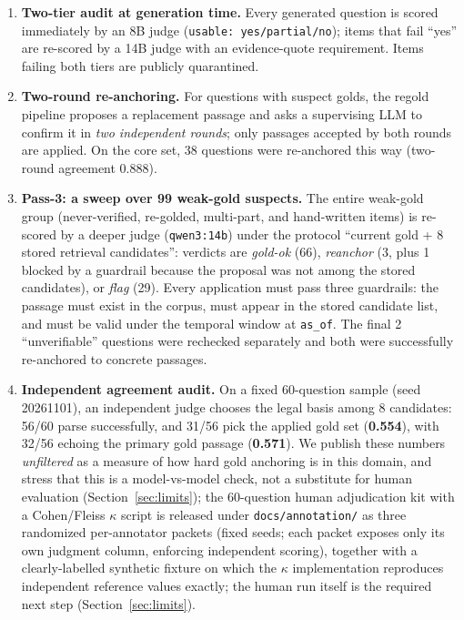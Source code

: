 \documentclass[10pt,a4paper,twocolumn]{article}
\newcommand{\code}[1]{\texttt{#1}}
\begin{document}
\begin{enumerate}
\item \textbf{Two-tier audit at generation time.} Every generated question is scored immediately by an 8B judge (\code{usable: yes/partial/no}); items that fail ``yes'' are re-scored by a 14B judge with an evidence-quote requirement. Items failing both tiers are publicly quarantined.
\item \textbf{Two-round re-anchoring.} For questions with suspect golds, the regold pipeline proposes a replacement passage and asks a supervising LLM to confirm it in \emph{two independent rounds}; only passages accepted by both rounds are applied. On the core set, 38 questions were re-anchored this way (two-round agreement 0.888).
\item \textbf{Pass-3: a sweep over 99 weak-gold suspects.} The entire weak-gold group (never-verified, re-golded, multi-part, and hand-written items) is re-scored by a deeper judge (\code{qwen3:14b}) under the protocol ``current gold + 8 stored retrieval candidates'': verdicts are \emph{gold-ok} (66), \emph{reanchor} (3, plus 1 blocked by a guardrail because the proposal was not among the stored candidates), or \emph{flag} (29). Every application must pass three guardrails: the passage must exist in the corpus, must appear in the stored candidate list, and must be valid under the temporal window at \code{as\_of}. The final 2 ``unverifiable'' questions were rechecked separately and both were successfully re-anchored to concrete passages.
\item \textbf{Independent agreement audit.} On a fixed 60-question sample (seed 20261101), an independent judge chooses the legal basis among 8 candidates: 56/60 parse successfully, and 31/56 pick the applied gold set (\textbf{0.554}), with 32/56 echoing the primary gold passage (\textbf{0.571}). We publish these numbers \emph{unfiltered} as a measure of how hard gold anchoring is in this domain, and stress that this is a model-vs-model check, not a substitute for human evaluation (Section~\ref{sec:limits}); the 60-question human adjudication kit with a Cohen/Fleiss $\kappa$ script is released under \code{docs/annotation/} as three randomized per-annotator packets (fixed seeds; each packet exposes only its own judgment column, enforcing independent scoring), together with a clearly-labelled synthetic fixture on which the $\kappa$ implementation reproduces independent reference values exactly; the human run itself is the required next step (Section~\ref{sec:limits}).
\end{enumerate}
\end{document}
